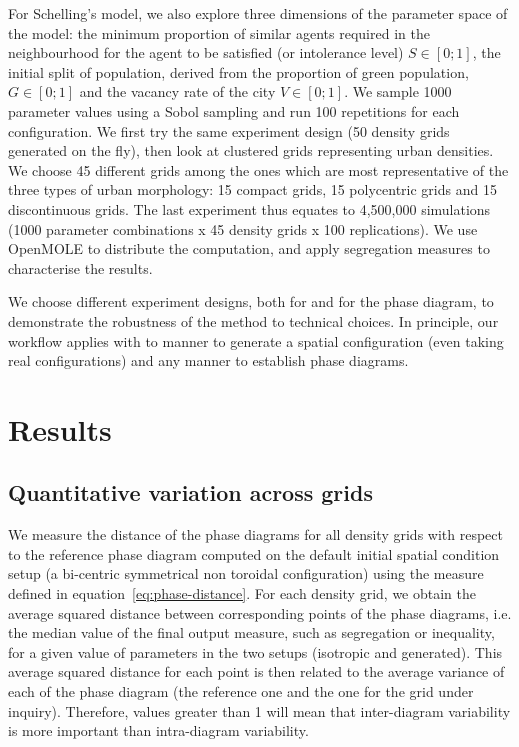 \documentclass[preprint,5p,times,twocolumn,authoryear]{elsarticle}
\def \draft {1}
\newcommand{\todo}[1]{
\ifthenelse{\draft=1}{\textcolor{red!50!blue}{\textbf{TODO : \textit{#1}}}}{}
}
\begin{document}
For Schelling's model, we also explore three dimensions of the parameter space of the model: the minimum proportion of similar agents required in the neighbourhood for the agent to be satisfied (or intolerance level) $S\in \left[0;1\right]$, the initial split of population, derived from the proportion of green population, $G\in \left[0;1\right]$ and the vacancy rate of the city $V\in \left[0;1\right]$. We sample 1000 parameter values using a Sobol sampling and run 100 repetitions for each configuration. We first try the same experiment design (50 density grids generated on the fly), then look at clustered grids representing urban densities. We choose 45 different grids among the ones which are most representative of the three types of urban morphology: 15 compact grids, 15 polycentric grids and 15 discontinuous grids. The last experiment thus equates to 4,500,000 simulations (1000 parameter combinations x 45 density grids x 100 replications). We use OpenMOLE to distribute the computation, and apply segregation measures to characterise the results.



We choose different experiment designs, both for  and for the phase diagram, to demonstrate the robustness of the method to technical choices. In principle, our workflow applies with to manner to generate a spatial configuration (even taking real configurations) and any manner to establish phase diagrams.




\section{Results}

\todo{add code and data availability statement here}

\subsection{Quantitative variation across grids}

We measure the distance of the phase diagrams for all density grids with respect to the reference phase diagram computed on the default initial spatial condition setup (a bi-centric symmetrical non toroidal configuration) using the measure defined in equation~\ref{eq:phase-distance}. For each density grid, we obtain the average squared distance between corresponding points of the phase diagrams, i.e. the median value of the final output measure, such as segregation or inequality, for a given value of parameters in the two setups (isotropic and generated). This average squared distance for each point is then related to the average variance of each of the phase diagram (the reference one and the one for the grid under inquiry). Therefore, values greater than 1 will mean that inter-diagram variability is more important than intra-diagram variability.
\end{document}

